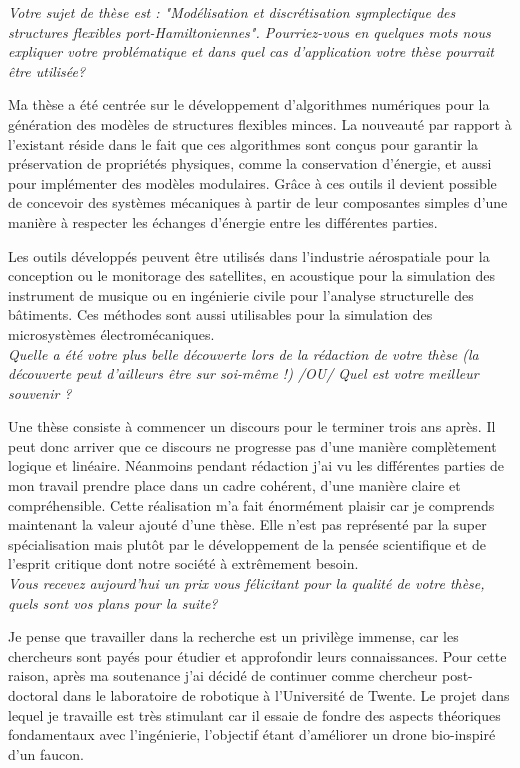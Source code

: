 \documentclass[16pt]{article}
\begin{document}
	\Large
	\textit{Votre sujet de thèse est : "Modélisation et discrétisation
		symplectique des structures flexibles port-Hamiltoniennes". 
		Pourriez-vous en quelques mots nous expliquer votre problématique et dans quel cas d'application votre thèse pourrait être utilisée?
\\}
	
	
	Ma thèse a été centrée sur le développement d'algorithmes numériques pour la génération des modèles de structures flexibles minces. La nouveauté par rapport à l'existant réside dans le fait que ces algorithmes sont conçus pour garantir la préservation de propriétés physiques, comme la conservation d'énergie, et aussi pour implémenter des modèles modulaires. Grâce à ces outils il devient possible de concevoir des systèmes mécaniques à partir de leur composantes simples d'une manière à respecter les échanges d'énergie entre les différentes parties. 
	
	Les outils développés peuvent être utilisés dans l'industrie aérospatiale pour la conception ou le monitorage des satellites, en acoustique pour la simulation des instrument de musique ou en ingénierie civile pour l'analyse structurelle des bâtiments. Ces méthodes sont aussi utilisables pour la simulation des microsystèmes électromécaniques.
\\
	
	\textit{Quelle a été votre plus belle découverte lors de la rédaction de votre thèse (la découverte peut d’ailleurs être sur soi-même !) /OU/ Quel est votre meilleur souvenir ? \\}
	
	 Une thèse consiste à commencer un discours pour le terminer trois ans après. Il peut donc arriver que ce discours ne progresse pas d'une manière complètement logique et linéaire. Néanmoins pendant rédaction j'ai vu les différentes parties de mon travail prendre place dans un cadre cohérent, d'une manière claire et compréhensible. Cette réalisation m'a fait énormément plaisir car je comprends maintenant la valeur ajouté d'une thèse. Elle n'est pas représenté par la super spécialisation mais plutôt par le développement de la pensée scientifique et de l'esprit critique dont notre société à extrêmement besoin. \\
	 
	\textit{Vous recevez aujourd'hui un prix vous félicitant pour la qualité de votre thèse, quels sont vos plans pour la suite? \\}
	          
	
	Je pense que travailler dans la recherche est un privilège immense, car les chercheurs sont payés pour étudier et approfondir leurs connaissances. Pour cette raison, après ma soutenance j'ai décidé de continuer comme chercheur post-doctoral dans le laboratoire de robotique à l'Université de Twente. Le projet dans lequel je travaille est très stimulant car il essaie de fondre des aspects théoriques fondamentaux avec l'ingénierie, l'objectif étant d'améliorer un drone bio-inspiré d'un faucon. 
	
\end{document}
